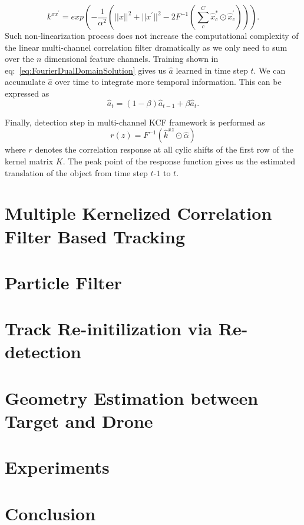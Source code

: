 \documentclass[10pt,twocolumn,letterpaper]{article}
\begin{document}
\begin{equation}
k^{xx^{'}} = exp(-\dfrac{1}{\alpha^{2}}(||x||^{2}+||x^{'}||^{2}-2F^{-1}(\sum^{C}_{c}\hat{x}_{c}^{*}\odot \hat{x}_{c}^{'}))).
\label{eq:GaussianCorrelationSingleChannel}
\end{equation}
Such non-linearization process does not increase the computational complexity of the linear multi-channel correlation filter dramatically as we only need to sum over the $n$ dimensional feature channels. Training shown in eq:~\ref{eq:FourierDualDomainSolution} gives us $\hat{a}$ learned in time step $t$. We can accumulate $\hat{a}$ over time to integrate more temporal information. This can be expressed as
\begin{equation}
\hat{a}_{t} = (1-\beta)\hat{a}_{t-1} + \beta\hat{a}_{t}. 
\end{equation}

Finally, detection step in multi-channel KCF framework is performed as
\begin{equation}
r(z) = F^{-1}(\hat{k}^{xz} \odot \hat{\alpha})
\end{equation}
where $r$ denotes the correlation response at all cylic shifts of the first row of the kernel matrix $K$. The peak point of the response function gives us the estimated translation of the object from time step $t$-$1$ to $t$.

\section{Multiple Kernelized Correlation Filter Based Tracking}
\label{sc:MKCF}

\section{Particle Filter}
\label{sc:PF}

\section{Track Re-initilization via Re-detection}
\label{sc:Re-initialization}

\section{Geometry Estimation between Target and Drone}
\label{sc:Geometry}

\section{Experiments}
\label{sc:Experiments}

\section{Conclusion}
\label{sc:Conclusion}


\small


\end{document}
